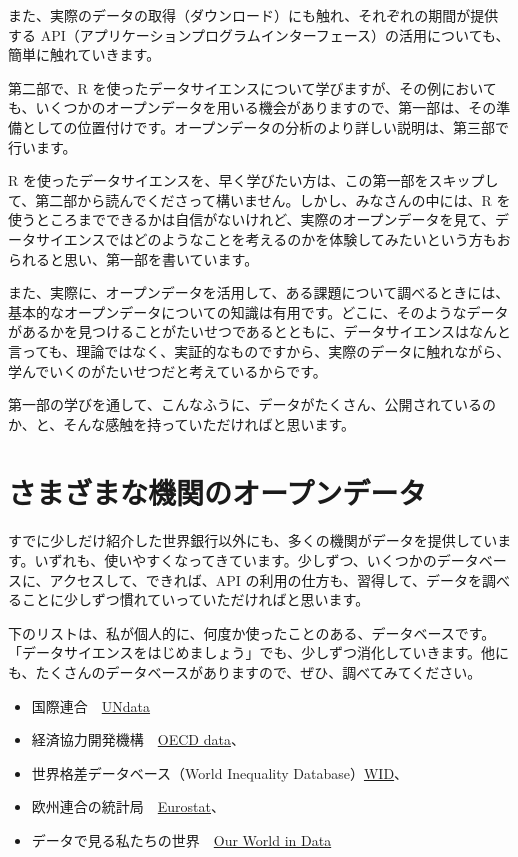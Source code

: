\documentclass[
  xelatex, ja=standard]{bxjsbook}
\providecommand{\tightlist}{%
  \setlength{\itemsep}{0pt}\setlength{\parskip}{0pt}}
\theoremstyle{definition}
\theoremstyle{definition}
\theoremstyle{definition}
\theoremstyle{definition}
\theoremstyle{remark}
\begin{document}
また、実際のデータの取得（ダウンロード）にも触れ、それぞれの期間が提供する API（アプリケーションプログラムインターフェース）の活用についても、簡単に触れていきます。

第二部で、R を使ったデータサイエンスについて学びますが、その例においても、いくつかのオープンデータを用いる機会がありますので、第一部は、その準備としての位置付けです。オープンデータの分析のより詳しい説明は、第三部で行います。

R を使ったデータサイエンスを、早く学びたい方は、この第一部をスキップして、第二部から読んでくださって構いません。しかし、みなさんの中には、R を使うところまでできるかは自信がないけれど、実際のオープンデータを見て、データサイエンスではどのようなことを考えるのかを体験してみたいという方もおられると思い、第一部を書いています。

また、実際に、オープンデータを活用して、ある課題について調べるときには、基本的なオープンデータについての知識は有用です。どこに、そのようなデータがあるかを見つけることがたいせつであるとともに、データサイエンスはなんと言っても、理論ではなく、実証的なものですから、実際のデータに触れながら、学んでいくのがたいせつだと考えているからです。

第一部の学びを通して、こんなふうに、データがたくさん、公開されているのか、と、そんな感触を持っていただければと思います。

\hypertarget{ux3055ux307eux3056ux307eux306aux6a5fux95a2ux306eux30aaux30fcux30d7ux30f3ux30c7ux30fcux30bf}{%
\section{さまざまな機関のオープンデータ}\label{ux3055ux307eux3056ux307eux306aux6a5fux95a2ux306eux30aaux30fcux30d7ux30f3ux30c7ux30fcux30bf}}

すでに少しだけ紹介した世界銀行以外にも、多くの機関がデータを提供しています。いずれも、使いやすくなってきています。少しずつ、いくつかのデータベースに、アクセスして、できれば、API の利用の仕方も、習得して、データを調べることに少しずつ慣れていっていただければと思います。

下のリストは、私が個人的に、何度か使ったことのある、データベースです。「データサイエンスをはじめましょう」でも、少しずつ消化していきます。他にも、たくさんのデータベースがありますので、ぜひ、調べてみてください。

\begin{itemize}
\tightlist
\item
  国際連合　\href{https://data.un.org}{UNdata}
\item
  経済協力開発機構　\href{https://data.oecd.org}{OECD data}、
\item
  世界格差データベース（World Inequality Database）\href{https://wid.world}{WID}、
\item
  欧州連合の統計局　\href{https://ec.europa.eu/eurostat}{Eurostat}、
\item
  データで見る私たちの世界　\href{https://ourworldindata.org}{Our World in Data}
\end{itemize}
\end{document}
